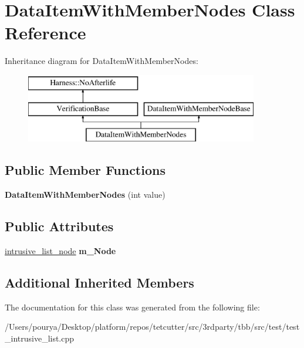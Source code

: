 \hypertarget{classDataItemWithMemberNodes}{}\section{Data\+Item\+With\+Member\+Nodes Class Reference}
\label{classDataItemWithMemberNodes}
Inheritance diagram for Data\+Item\+With\+Member\+Nodes\+:\begin{figure}[H]
\begin{center}
\leavevmode
\includegraphics[height=3.000000cm]{classDataItemWithMemberNodes}
\end{center}
\end{figure}
\subsection*{Public Member Functions}
\begin{DoxyCompactItemize}
\item 
\hypertarget{classDataItemWithMemberNodes_a3d2d4edb8c10e6e77fb7b57b18cb0f96}{}{\bfseries Data\+Item\+With\+Member\+Nodes} (int value)\label{classDataItemWithMemberNodes_a3d2d4edb8c10e6e77fb7b57b18cb0f96}

\end{DoxyCompactItemize}
\subsection*{Public Attributes}
\begin{DoxyCompactItemize}
\item 
\hypertarget{classDataItemWithMemberNodes_ad4b355abb80c393af580040365ce1b20}{}\hyperlink{structtbb_1_1internal_1_1intrusive__list__node}{intrusive\+\_\+list\+\_\+node} {\bfseries m\+\_\+\+Node}\label{classDataItemWithMemberNodes_ad4b355abb80c393af580040365ce1b20}

\end{DoxyCompactItemize}
\subsection*{Additional Inherited Members}


The documentation for this class was generated from the following file\+:\begin{DoxyCompactItemize}
\item 
/\+Users/pourya/\+Desktop/platform/repos/tetcutter/src/3rdparty/tbb/src/test/test\+\_\+intrusive\+\_\+list.\+cpp\end{DoxyCompactItemize}
